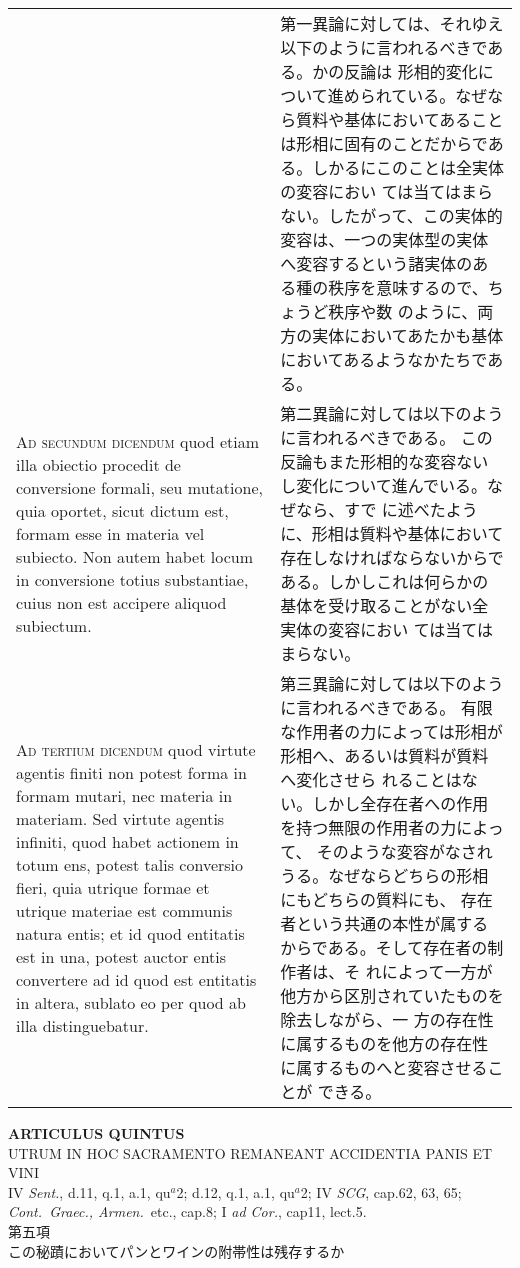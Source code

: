 \documentclass[10pt]{jsarticle} %
\begin{document}
\begin{longtable}{p{21em}p{21em}}
&

第一異論に対しては、それゆえ以下のように言われるべきである。かの反論は
 形相的変化について進められている。なぜなら質料や基体においてあること
 は形相に固有のことだからである。しかるにこのことは全実体の変容におい
 ては当てはまらない。したがって、この実体的変容は、一つの実体型の実体
 へ変容するという諸実体のある種の秩序を意味するので、ちょうど秩序や数
 のように、両方の実体においてあたかも基体においてあるようなかたちであ
 る。


\\



{\scshape Ad secundum dicendum} quod etiam illa obiectio procedit de conversione
formali, seu mutatione, quia oportet, sicut dictum est, formam esse in
materia vel subiecto. Non autem habet locum in conversione totius
substantiae, cuius non est accipere aliquod subiectum.

&

第二異論に対しては以下のように言われるべきである。
この反論もまた形相的な変容ないし変化について進んでいる。なぜなら、すで
 に述べたように、形相は質料や基体において存在しなければならないからで
 ある。しかしこれは何らかの基体を受け取ることがない全実体の変容におい
 ては当てはまらない。

\\



{\scshape Ad tertium dicendum} quod virtute agentis finiti non potest forma in
formam mutari, nec materia in materiam. Sed virtute agentis infiniti,
quod habet actionem in totum ens, potest talis conversio fieri, quia
utrique formae et utrique materiae est communis natura entis; et id
quod entitatis est in una, potest auctor entis convertere ad id quod
est entitatis in altera, sublato eo per quod ab illa distinguebatur.

&

第三異論に対しては以下のように言われるべきである。
有限な作用者の力によっては形相が形相へ、あるいは質料が質料へ変化させら
 れることはない。しかし全存在者への作用を持つ無限の作用者の力によって、
 そのような変容がなされうる。なぜならどちらの形相にもどちらの質料にも、
 存在者という共通の本性が属するからである。そして存在者の制作者は、そ
 れによって一方が他方から区別されていたものを除去しながら、一
 方の存在性に属するものを他方の存在性に属するものへと変容させることが
 できる。


\end{longtable}
\newpage


\begin{center}
{\Large {\bf ARTICULUS QUINTUS}}\\
{\large UTRUM IN HOC SACRAMENTO REMANEANT ACCIDENTIA PANIS ET VINI}\\
{\footnotesize IV {\itshape Sent.}, d.11, q.1, a.1, qu$^a$2; d.12,
 q.1, a.1, qu$^a$2; IV {\itshape SCG}, cap.62, 63, 65; \\{\itshape
 Cont.~Graec., Armen.}~etc., cap.8; I {\itshape ad Cor.}, cap11, lect.5.}\\
{\Large 第五項\\この秘蹟においてパンとワインの附帯性は残存するか}
\end{center}
\end{document}
